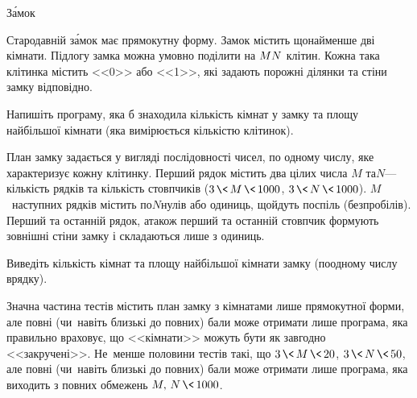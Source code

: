 \begin{problemAllDefault}{З\'{а}мок}


Стародавній з\'{а}мок має прямокутну форму. Замок містить щонайменше дві кімнати. Підлогу замка можна умовно поділити на $M{\*}N$ клітин. Кожна така клітинка містить <<0>> або <<1>>, які задають порожні ділянки та стіни замку відповідно.

Напишіть програму, яка б знаходила кількість кімнат у зам\-ку та площу найбільшої кімнати (яка вимірюється кількістю клітинок).

\InputFile 
План замку задається у вигляді послідовності чисел, по одному числу, яке характеризує кожну клітинку. Перший рядок містить два цілих числа $M$ та\nolinebreak[2] $N$\nolinebreak[3] --- кількість рядків та кількість стовпчиків (${3\,{\<}\,M\,{\<}\,1000}$, ${3\,{\<}\,N\,{\<}\,1000}$). $M$~наступних рядків містить по\nolinebreak[3] $N$\nolinebreak[3] нулів або одиниць, що\nolinebreak[3] йдуть поспіль (без\nolinebreak[2] пробілів). Перший та останній рядок, а\nolinebreak[3] також перший та останній стовпчик формують зовнішні стіни замку і складаються лише з одиниць.

\OutputFile Виведіть кількість кімнат та площу найбільшої кімнати замку (по\nolinebreak[3] одному числу в\nolinebreak[3] рядку).


\Examples
\begin{exampleSimple}{5em}{5em}
%
\end{exampleSimple}
\begin{exampleSimple}{6em}{5em}
%
\end{exampleSimple}

\Scoring Значна частина тестів містить план замку з кімнатами лише прямокутної форми, але повні (чи~навіть близькі до повних) бали може отримати лише програма, яка правильно враховує, що <<кімнати>> можуть бути як завгодно <<закручені>>. Не~менше половини тестів такі, що ${3\,{\<}\,M\,{\<}\,20}$, ${3\,{\<}\,N\,{\<}\,50}$, але повні (чи~навіть близькі до повних) бали може отримати лише програма, яка виходить з повних обмежень ${M,\,N\,{\<}\,1000}$.

\end{problemAllDefault}

